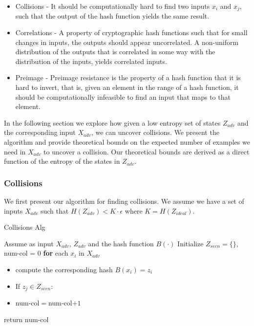 \documentclass[letterpaper,twocolumn,10pt]{article}
\begin{document}
\begin{itemize}
\item Collisions - It should be computationally hard to find two inputs $x_{i}$ and $x_{j}$, such that the output of the hash function yields the same result.
\item Correlations - A property of cryptographic hash functions such that for small changes in inputs, the outputs should appear uncorrelated. A non-uniform distribution of the outputs that is correlated in some way with the distribution of the inputs, yields correlated inputs. 
\item Preimage - Preimage resistance is the property of a hash function that it is hard to invert, that is, given an element in the range of a hash function, it should be computationally infeasible to find an input that maps to that element.
\end{itemize}

In the following section we explore how given a low entropy set of states $Z_{adv}$ and the corresponding input $X_{adv}$, we can uncover collisions. We present the algorithm and provide theoretical bounds on the expected number of examples we need in $X_{adv}$ to uncover a collision. Our theoretical bounds are derived as a direct function of the entropy of the states in $Z_{adv}$.  


\subsubsection{Collisions}
We first present our algorithm for finding collisions. We assume we have a set of inputs $X_{adv}$ such that $H(Z_{adv}) < K \cdot \epsilon$ where $K = H(Z_{ideal})$.

\begin{algorithm} \label{alg:col}
\caption{Collisions Alg}\label{sampling}
\begin{algorithmic}[1]
\State Assume as input $X_{adv}$, $Z_{adv}$ and the hash function $B(\cdot)$
\State Initialize $Z_{seen} = \{\}$, num-col = 0
\State \textbf{for} each $x_{i}$ in $X_{adv}$
\begin{itemize}
\item compute the corresponding hash $B(x_{i}) = z_{i}$
\item If $z_{j} \in Z_{seen}$:
\item  num-col$=$num-col$ + 1$
\end{itemize}
\item return num-col
\end{algorithmic}
\end{algorithm}
\end{document}
